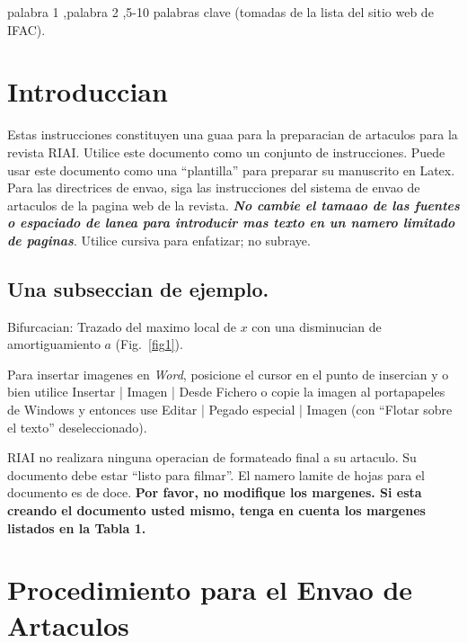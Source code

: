 \documentclass[5p,times,authoryear]{elsarticle}
\begin{document}
\begin{frontmatter}
\begin{keyword}


palabra 1 \sep palabra 2 \sep 5-10 palabras clave (tomadas de la lista del sitio web de IFAC).

\end{keyword}

\end{frontmatter}


\section{Introduccian}
Estas instrucciones constituyen una guaa para la preparacian de
artaculos para la revista RIAI. Utilice este documento como un
conjunto de instrucciones. Puede usar este documento como
una ``plantilla'' para preparar su manuscrito en Latex. Para las directrices
de envao, siga las instrucciones del sistema de envao de artaculos
de la pagina web de la revista.
 {\bf{\emph {No cambie el tamaao de las fuentes o espaciado de lanea para introducir mas texto en un namero limitado de paginas}}}.  Utilice cursiva para enfatizar; no subraye.

\subsection{Una subseccian de ejemplo.}
Bifurcacian: Trazado del maximo local de $x$ con una disminucian de amortiguamiento $a$ (Fig.~\ref{fig1}).

Para insertar imagenes en \emph{Word}, posicione el cursor en el punto de insercian y o bien utilice Insertar | Imagen | Desde Fichero o copie la imagen al portapapeles de Windows y entonces use Editar | Pegado especial | Imagen (con ``Flotar sobre el texto'' deseleccionado).

RIAI no realizara ninguna operacian de formateado final a su artaculo. Su documento debe estar ``listo para filmar''. El namero lamite de hojas para el documento es de doce. {\bf Por favor, no modifique los margenes. Si esta creando el documento usted mismo, tenga en cuenta los margenes listados en la Tabla 1.}

\section{Procedimiento para el Envao de Artaculos}
\end{document}
